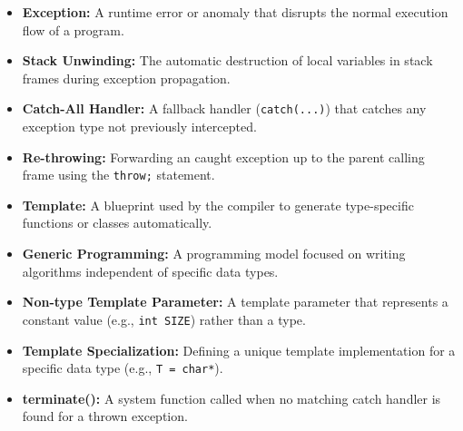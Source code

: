 \documentclass[12pt,a4paper]{article}
\begin{document}
\begin{tcolorbox}[defbox, title={\textbf{One-Line Definitions}}]
\begin{itemize}[leftmargin=*, itemsep=2.5pt, topsep=0pt]
  \item \textbf{Exception:} A runtime error or anomaly that disrupts the normal execution flow of a program.
  \item \textbf{Stack Unwinding:} The automatic destruction of local variables in stack frames during exception propagation.
  \item \textbf{Catch-All Handler:} A fallback handler (\texttt{catch(...)}) that catches any exception type not previously intercepted.
  \item \textbf{Re-throwing:} Forwarding an caught exception up to the parent calling frame using the \texttt{throw;} statement.
  \item \textbf{Template:} A blueprint used by the compiler to generate type-specific functions or classes automatically.
  \item \textbf{Generic Programming:} A programming model focused on writing algorithms independent of specific data types.
  \item \textbf{Non-type Template Parameter:} A template parameter that represents a constant value (e.g., \texttt{int SIZE}) rather than a type.
  \item \textbf{Template Specialization:} Defining a unique template implementation for a specific data type (e.g., \texttt{T = char*}).
  \item \textbf{terminate():} A system function called when no matching catch handler is found for a thrown exception.
\end{itemize}
\end{tcolorbox}
\end{document}
